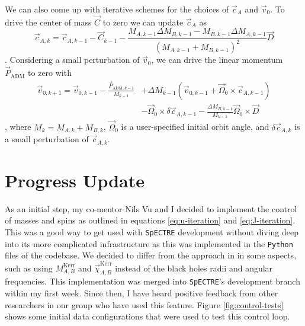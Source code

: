 \documentclass{../document}
\begin{document}
  We can also come up with iterative schemes for the choices of $\vec c_A$ and $\vec v_0$. To drive the center of mass $\vec C$ to zero we can update $\vec c_A$ as
  \begin{equation} \label{eq:cA-iteration}
		\vec c_{A,k} = \vec c_{A,k-1} - \vec C_{k-1} - \frac{M_{A,k-1}  \Delta M_{B,k-1} - M_{B,k-1} \Delta M_{A,k-1}}{(M_{A,k-1} + M_{B,k-1})^2} \vec D
  \end{equation}
  \cite{Serguei}. Considering a small perturbation of $\vec v_0$, we can drive the linear momentum $\vec P_\text{ADM}$ to zero with
  \begin{equation}\label{eq:v0-iteration}
    \begin{aligned}
      \vec v_{0,k+1} = \vec v_{0,k-1} - \frac{\vec P_{\text{ADM},k-1}}{M_{k-1}} &+ \Delta M_{k-1} (\vec v_{0,k-1} + \vec\Omega_0 \times \vec c_{A,k-1}) \\
      &- \vec\Omega_0 \times \delta \vec c_{A,k-1} - \frac{\Delta M_{B,k-1}}{M_{k-1}} \vec\Omega_0 \times \vec D
    \end{aligned}
  \end{equation}
	\cite{Serguei}, where $M_k = M_{A,k} + M_{B,k}$, $\vec \Omega_0$ is a user-specified initial orbit angle, and $\delta \vec c_{A,k}$ is a small perturbation of $\vec c_{A,k}$.

	\section{Progress Update}

  As an initial step, my co-mentor Nils Vu and I decided to implement the control of masses and spins as outlined in equations \eqref{eq:u-iteration} and \eqref{eq:J-iteration}. This was a good way to get used with {\tt SpECTRE} development without diving deep into its more complicated infrastructure as this was implemented in the {\tt Python} files of the codebase. We decided to differ from the approach in \cite{Serguei} in some aspects, such as using $M^\text{Kerr}_{A,B}$ and $\vec\chi^\text{Kerr}_{A,B}$ instead of the black holes radii and angular frequencies. This implementation was merged into {\tt SpECTRE}'s development branch within my first week. Since then, I have heard positive feedback from other researchers in our group who have used this feature. Figure \ref{fig:control-tests} shows some initial data configurations that were used to test this control loop.
\end{document}
